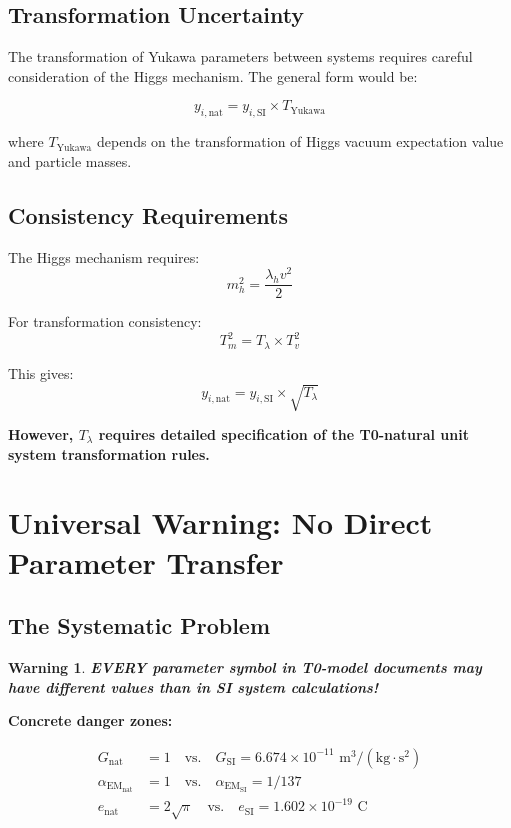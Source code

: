 \documentclass[12pt,a4paper]{article}
\newcommand{\alphaEM}{\alpha_{\text{EM}}}
\newcommand{\lambdah}{\lambda_h}
\newcommand{\pichar}{\pi}
\newtheorem{warning}[theorem]{Warning}
\begin{document}
	\subsection{Transformation Uncertainty}
	\label{subsec:yukawa_transformation}
	
	The transformation of Yukawa parameters between systems requires careful consideration of the Higgs mechanism. The general form would be:
	
	$$y_{i,\text{nat}} = y_{i,\text{SI}} \times T_{\text{Yukawa}}$$
	
	where $T_{\text{Yukawa}}$ depends on the transformation of Higgs vacuum expectation value and particle masses.
	
	\subsection{Consistency Requirements}
	\label{subsec:yukawa_consistency}
	
	The Higgs mechanism requires:
	$$m_h^2 = \frac{\lambdah v^2}{2}$$
	
	For transformation consistency:
	$$T_m^2 = T_\lambda \times T_v^2$$
	
	This gives:
	$$y_{i,\text{nat}} = y_{i,\text{SI}} \times \sqrt{T_\lambda}$$
	
	\textbf{However, $T_\lambda$ requires detailed specification of the T0-natural unit system transformation rules.}
	
	\section{Universal Warning: No Direct Parameter Transfer}
	\label{sec:universal_warning}
	
	\subsection{The Systematic Problem}
	\label{subsec:systematic_problem}
	
	\begin{warning}
		\textbf{EVERY parameter symbol in T0-model documents may have different values than in SI system calculations!}
	\end{warning}
	
	\textbf{Concrete danger zones:}
	
	\begin{align}
		G_{\text{nat}} &= 1 \quad \text{vs.} \quad G_{\text{SI}} = 6.674 \times 10^{-11} \text{ m}^3/(\text{kg} \cdot \text{s}^2) \\
		\alphaEM_{\text{nat}} &= 1 \quad \text{vs.} \quad \alphaEM_{\text{SI}} = 1/137 \\
		e_{\text{nat}} &= 2\sqrt{\pichar} \quad \text{vs.} \quad e_{\text{SI}} = 1.602 \times 10^{-19} \text{ C}
	\end{align}
	
\end{document}
